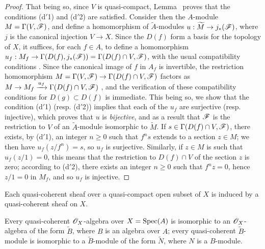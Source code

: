 \begin{proof}
That being so, since $V$ is quasi-compact, Lemma~ proves that
the conditions (d$'$1) and (d$'$2) are satisfied.
Consider then the $A$-module $M=\Gamma(V,\mathscr{F})$, and define a homomorphism of $\widetilde{A}$-modules $u:\widetilde{M}\to j_*(\sh{F})$, where $j$ is the canonical injection $V\to X$.
Since the $D(f)$ form a basis for the topology of $X$, it suffices, for each $f\in A$, to define a homomorphism $u_f:M_f\to\Gamma(D(f),j_*(\sh{F}))=\Gamma(D(f)\cap V,\sh{F})$, with the usual compatibility conditions .
Since the canonical image of $f$ in $A_f$ is invertible, the restriction homomorphism $M=\Gamma(V,\sh{F})\to\Gamma(D(f)\cap V,\sh{F})$ factors as $M\to M_f\xrightarrow{u_f}\Gamma(D(f)\cap V,\sh{F})$ , and the verification of these compatibility conditions for $D(g)\subset D(f)$ is immediate.
This being so, we show that the condition (d$'$1) (resp. (d$'$2)) implies that each of the $u_f$ are surjective (resp. injective), which proves that $u$ is \emph{bijective}, and as a result that $\mathscr{F}$ is the restriction to $V$ of an $\widetilde{A}$-module isomorphic to $\widetilde{M}$.
If $s\in\Gamma(D(f)\cap V,\mathscr{F})$, there exists, by (d$'$1), an integer $n\geq 0$ such that $f^n s$ extends to a section $z\in M$;
we then have $u_f(z/f^n)=s$, so $u_f$ is surjective.
Similarly, if $z\in M$ is such that $u_f(z/1)=0$, this means that the restriction to $D(f)\cap V$ of the section $z$ is zero;
according to (d$'$2), there exists an integer $n\geq 0$ such that $f^n z=0$, hence $z/1=0$ in $M_f$, and so $u_f$ is injective.
\end{proof}

\begin{corollary}[1.4.2]
\label{I.1.4.2}
Each quasi-coherent sheaf over a quasi-compact open subset of $X$ is induced by a quasi-coherent sheaf on $X$.
\end{corollary}

\begin{corollary}[1.4.3]
\label{I.1.4.3}
Every quasi-coherent $\mathscr{O}_X$-algebra over $X=\operatorname{Spec}(A)$ is isomorphic to an $\mathscr{O}_X$-algebra of the form $\widetilde{B}$, where $B$ is an algebra over $A$;
every quasi-coherent $\widetilde{B}$-module is isomorphic to a $\widetilde{B}$-module of the form $\widetilde{N}$, where $N$ is a $B$-module.
\end{corollary}

